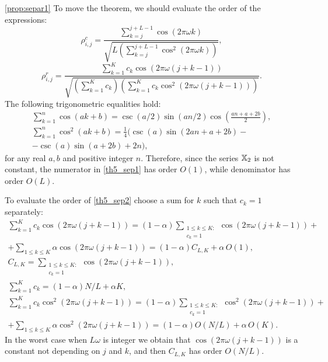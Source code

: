 \documentclass[12pt,a4paper,fleqn,leqno]{article}
\begin{document}
\begin{proof5}{\ref{prop:separ1}}
To move the theorem, we should evaluate the order of the expressions:
\begin{equation}\label{th5_sep1}
\rho^c_{i,j} = \frac{\sum_{k=j}^{j + L - 1} \cos(2 \pi \omega k)}{\sqrt{L (\sum_{k=j}^{j + L - 1} \cos^2(2 \pi \omega k))}},
\end{equation}
\begin{equation}\label{th5_sep2}
 \rho^r_{i,j} = \frac{\sum_{k=1}^K c_k\cos(2 \pi \omega (j + k - 1))}{\sqrt{(\sum_{k=1}^K c_k) (\sum_{k=1}^K c_k\cos^2(2 \pi \omega (j + k - 1)))}}.
\end{equation}
The following trigonometric equalities hold:
\begin{gather*}
\sum_{k=1}^n \cos(ak + b) = \csc(a/2) \sin(an / 2) \cos \left(\frac{an + a + 2b}{2} \right), \\
\sum_{k=1}^n \cos^2(ak + b) = \frac{1}{4}(\csc(a) \sin(2an + a + 2b) -\\ - \csc(a)\sin(a + 2b) + 2n),
\end{gather*}
for any real $a, b$ and positive integer $n$.
Therefore, since the series $\mathbb{X}_2$ is not constant, the numerator in \eqref{th5_sep1} has order $O(1)$, while denominator has order $O(L)$.

To evaluate the order of \eqref{th5_sep2} choose a sum for $k$ such that $c_k=1$ separately:
\begin{gather*}
\sum_{k=1}^K c_k\cos(2 \pi \omega (j + k - 1)) = (1-\alpha) \sum_{\substack{1 \le k \le K: \\ c_k = 1}}\cos(2 \pi \omega (j + k - 1)) +\\ +\sum_{1 \le k \le K}\alpha \cos(2 \pi \omega (j + k - 1)) = (1-\alpha) C_{L,K} + \alpha\, O(1),
\\
C_{L, K} = \sum_{\substack{1 \le k \le K: \\ c_k = 1}}\cos(2 \pi \omega (j + k - 1)),
\\
\sum_{k=1}^K c_k = (1-\alpha) N/L + \alpha K,
\\
\sum_{k=1}^K c_k\cos^2(2 \pi \omega (j + k - 1)) = (1-\alpha)\sum_{\substack{1 \le k \le K: \\ c_k = 1}}\cos^2(2 \pi \omega (j + k - 1)) +\\ +\sum_{1 \le k \le K }\alpha \cos^2(2 \pi \omega (j + k - 1)) = (1-\alpha) O(N/L) + \alpha\, O(K).
\end{gather*}
In the worst case when $L\omega$ is integer we obtain that $\cos(2 \pi \omega (j + k - 1))$ is a constant not depending on $j$ and $k$, and then $C_{L,K}$ has order $O(N/L)$.
\end{proof5}
\end{document}
